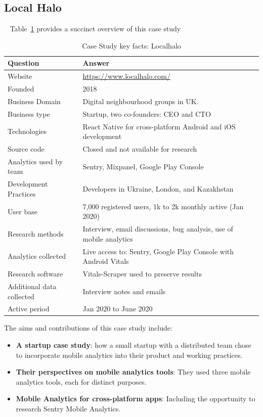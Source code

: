 \clearpage
\subsection{Local Halo}~\label{study-localhalo}
Table~\ref{tab:local_halo_anaytics_overview} provides a succinct overview of this case study

{\renewcommand{\arraystretch}{0.8}%
\begin{table}[htbp!]
    \centering
    \small
    \setlength{\tabcolsep}{1pt}
    \begin{tabular}{ll}
       Question &Answer  \\
       \toprule
       Website &\url{https://www.localhalo.com/} \\
       Founded &2018 \\
       Business Domain &Digital neighbourhood groups in UK.\\
       Business type &Startup, two co-founders: CEO and CTO \\
       Technologies  &React Native for cross-platform Android and iOS development \\
       Source code  &Closed and not available for research \\
       Analytics used by team &Sentry, Mixpanel, Google Play Console \\
       Development Practices &Developers in Ukraine, London, and Kazakhstan \\
       \midrule
       User base &7,000 registered users, 1k to 2k monthly active (Jan 2020) \\
       \midrule
       Research methods &Interview, email discussions, bug analysis, use of mobile analytics \\
       Analytics collected &Live access to: Sentry, Google Play Console with Android Vitals \\
       Research software &Vitals-Scraper used to preserve results \\
       Additional data collected &Interview notes and emails \\
       Active period &Jan 2020 to June 2020 \\
       \bottomrule
    \end{tabular}
    \caption{Case Study key facts: Localhalo}
    \label{tab:local_halo_anaytics_overview}
\end{table}
}

The aims and contributions of this case study include:
\begin{itemize}
    \item \textbf{A startup case study}: how a small startup with a distributed team chose to incorporate mobile analytics into their product and working practices.
    \item \textbf{Their perspectives on mobile analytics tools}: They used three mobile analytics tools, each for distinct purposes. 
    \item \textbf{Mobile Analytics for cross-platform apps}: Including the opportunity to research Sentry Mobile Analytics. 
\end{itemize}


